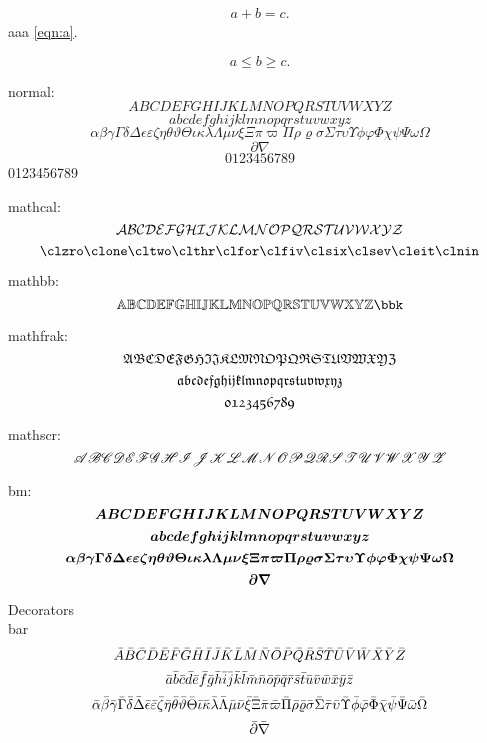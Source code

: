 \documentclass{article}
\begin{document}
\begin{align}
  a + b = c.
  \label{eqn:a}
\end{align}
aaa \eqref{eqn:a}.

\[
  a \le b \ge c.
\]

normal:
\[ A B C D E F G H I J K L M N O P Q R S T U V W X Y Z \]
\[ a b c d e f g h i j k l m n o p q r s t u v w x y z \]
\[ \alpha \beta \gamma \Gamma \delta \Delta \epsilon \varepsilon \zeta \eta \theta \vartheta \Theta \iota \kappa \lambda \Lambda \mu \nu \xi \Xi \pi \varpi \Pi \rho \varrho \sigma \Sigma \tau \upsilon \Upsilon \phi \varphi \Phi \chi \psi \Psi \omega \Omega \]
\[ \partial \nabla \]
\[0123456789\]
0123456789

mathcal:
\[ \clA \clB \clC \clD \clE \clF \clG \clH \clI \clJ \clK \clL \clM \clN \clO \clP \clQ \clR \clS \clT \clU \clV \clW \clX \clY \clZ \]
\[ \clzro \clone \cltwo \clthr \clfor \clfiv \clsix \clsev \cleit \clnin \]

mathbb:
\[ \bbA \bbB \bbC \bbD \bbE \bbF \bbG \bbH \bbI \bbJ \bbK \bbL \bbM \bbN \bbO \bbP \bbQ \bbR \bbS \bbT \bbU \bbV \bbW \bbX \bbY \bbZ \bbk \]

mathfrak:
\[ \frA \frB \frC \frD \frE \frF \frG \frH \frI \frJ \frK \frL \frM \frN \frO \frP \frQ \frR \frS \frT \frU \frV \frW \frX \frY \frZ \]
\[ \fraa \frbb \frcc \frdd \free \frff \frgg \frhh \frii \frjj \frkk \frll \frmm \frnn \froo \frpp \frqq \frrr \frss \frtt \fruu \frvv \frww \frxx \fryy \frzz \]
\[ \frzro \frone \frtwo \frthr \frfor \frfiv \frsix \frsev \freit \frnin \]

mathscr:
\[ \scA \scB \scC \scD \scE \scF \scG \scH \scI \scJ \scK \scL \scM \scN \scO \scP \scQ \scR \scS \scT \scU \scV \scW \scX \scY \scZ \]

bm:
\[ \bmA \bmB \bmC \bmD \bmE \bmF \bmG \bmH \bmI \bmJ \bmK \bmL \bmM \bmN \bmO \bmP \bmQ \bmR \bmS \bmT \bmU \bmV \bmW \bmX \bmY \bmZ \]
\[ \bmaa \bmbb \bmcc \bmdd \bmee \bmff \bmgg \bmhh \bmii \bmjj \bmkk \bmll \bmmm \bmnn \bmoo \bmpp \bmqq \bmrr \bmss \bmtt \bmuu \bmvv \bmww \bmxx \bmyy \bmzz \]
\[ \bmalpha \bmbeta \bmgamma \bmGamma \bmdelta \bmDelta \bmepsilon \bmvarepsilon \bmzeta \bmeta \bmtheta \bmvartheta \bmTheta \bmiota \bmkappa \bmlambda \bmLambda \bmmu \bmnu \bmxi \bmXi \bmpi \bmvarpi \bmPi \bmrho \bmvarrho \bmsigma \bmSigma \bmtau \bmupsilon \bmUpsilon \bmphi \bmvarphi \bmPhi \bmchi \bmpsi \bmPsi \bmomega \bmOmega \]
\[ \bmpartial \bmnabla \]

Decorators\\

bar
\[ \Ab \Bb \Cb \Db \Eb \Fb \Gb \Hb \Ib \Jb \Kb \Lb \Mb \Nb \Ob \Pb \Qb \Rb \Sb \Tb \Ub \Vb \Wb \Xb \Yb \Zb \]
\[ \aab \bbb \ccb \ddb \eeb \ffb \ggb \hhb \iib \jjb \kkb \llb \mmb \nnb \oob \ppb \qqb \rrb \ssb \ttb \uub \vvb \wwb \xxb \yyb \zzb \]
\[ \alphab \betab \gammab \Gammab \deltab \Deltab \epsilonb \varepsilonb \zetab \etab \thetab \varthetab \Thetab \iotab \kappab \lambdab \Lambdab \mub \nub \xib \Xib \pib \varpib \Pib \rhob \varrhob \sigmab \Sigmab \taub \upsilonb \Upsilonb \phib \varphib \Phib \chib \psib \Psib \omegab \Omegab \]
\[ \partialb \nablab \]
\end{document}

